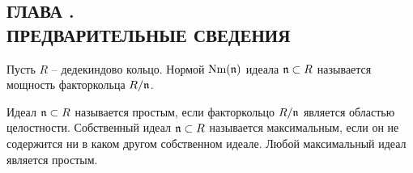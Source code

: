 \documentclass[_00_dissertation.tex]{subfiles}
\begin{document}
\onlyinsubfile{
    \renewcommand{\contentsname}{ОГЛАВЛЕНИЕ}
    \setcounter{tocdepth}{3}
    \tableofcontents
}

\newpage
\begin{center}
    \section*{ГЛАВА .\\ ПРЕДВАРИТЕЛЬНЫЕ СВЕДЕНИЯ}\label{ch:Prelimiaries}
\end{center}

Пусть $R$ -- дедекиндово кольцо.
Нормой $\textrm{Nm}(\mathfrak{n})$ идеала $\mathfrak{n} \subset R$ называется мощность факторкольца $R/\mathfrak{n}$.







Идеал $\mathfrak{n} \subset R$ называется простым, если факторкольцо $R/\mathfrak{n}$ является областью целостности.
Собственный идеал $\mathfrak{n} \subset R$ называется максимальным, если он не содержится ни в каком другом собственном идеале.
Любой максимальный идеал является простым.
\end{document}
